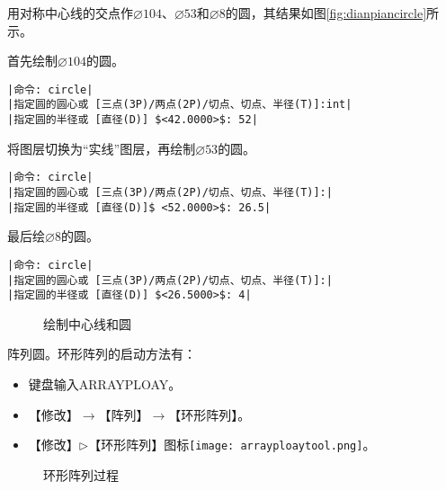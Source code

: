 \begin{procedure}
用对称中心线的交点作$\diameter 104$、$\diameter 53$和$\diameter 8$的圆，其结果如图\ref{fig:dianpiancircle}所示。

首先绘制$\diameter 104$的圆。
\begin{lstlisting}
|命令: circle|
|指定圆的圆心或 [三点(3P)/两点(2P)/切点、切点、半径(T)]:int|
|指定圆的半径或 [直径(D)] $<42.0000>$: 52|
\end{lstlisting}
将图层切换为“实线”图层，再绘制$\diameter 53$的圆。
\begin{lstlisting}
|命令: circle|
|指定圆的圆心或 [三点(3P)/两点(2P)/切点、切点、半径(T)]:|
|指定圆的半径或 [直径(D)]$ <52.0000>$: 26.5|
\end{lstlisting}
最后绘$\diameter 8$的圆。
\begin{lstlisting}
|命令: circle|
|指定圆的圆心或 [三点(3P)/两点(2P)/切点、切点、半径(T)]:|
|指定圆的半径或 [直径(D)] $<26.5000>$: 4|
\end{lstlisting}

\begin{figure}[htbp]
\centering
{}\hspace{20pt}
\caption{绘制中心线和圆}
\end{figure}
\item 阵列圆。环形阵列的启动方法有：
\begin{itemize}
\item 键盘输入ARRAYPLOAY。
\item 【修改】$\rightarrow$【阵列】$\rightarrow$【环形阵列】。
\item 【修改】$\triangleright$【环形阵列】图标\texttt{[image: arrayploaytool.png]}。
\end{itemize}

\begin{figure}[htbp]
\centering
{}\hspace{20pt}
\hspace{20pt}
\caption{环形阵列过程}
\end{figure}


\end{procedure}
